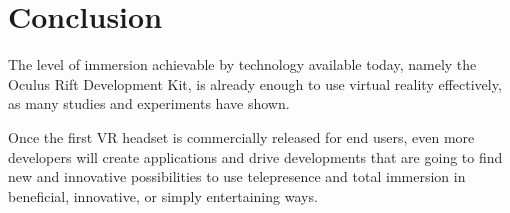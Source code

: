 \documentclass[11pt]{article}
\begin{document}
\section{Conclusion}
The level of immersion achievable by technology available today, namely the Oculus Rift Development Kit, is already enough to use virtual reality effectively, as many studies and experiments have shown.

Once the first VR headset is commercially released for end users, even more developers will create applications and drive developments that are going to find new and innovative possibilities to use telepresence and total immersion in beneficial, innovative, or simply entertaining ways.




\end{document}
